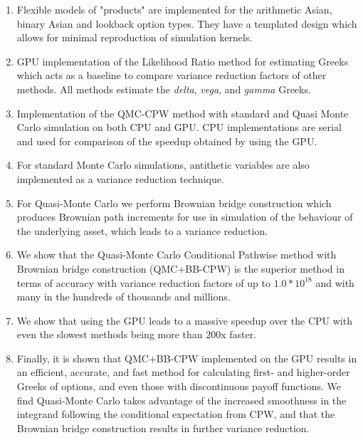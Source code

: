 \begin{enumerate}
    \item Flexible models of "products" are implemented for the arithmetic Asian, binary Asian and lookback option types. They have a templated design which allows for minimal reproduction of simulation kernels.
    \item GPU implementation of the Likelihood Ratio method for estimating Greeks which acts as a baseline to compare variance reduction factors of other methods. All methods estimate the \textit{delta}, \textit{vega}, and \textit{gamma} Greeks.
    \item Implementation of the QMC-CPW method with standard and Quasi Monte Carlo simulation on both CPU and GPU. CPU implementations are serial and used for comparison of the speedup obtained by using the GPU.
    \item For standard Monte Carlo simulations, antithetic variables are also implemented as a variance reduction technique.
    \item For Quasi-Monte Carlo we perform Brownian bridge construction which produces Brownian path increments for use in simulation of the behaviour of the underlying asset, which leads to a variance reduction.
    \item We show that the Quasi-Monte Carlo Conditional Pathwise method with Brownian bridge construction (QMC+BB-CPW) is the superior method in terms of accuracy with variance reduction factors of up to $1.0 * 10^{18}$ and with many in the hundreds of thousands and millions.
    \item We show that using the GPU leads to a massive speedup over the CPU with even the slowest methods being more than $200$x faster.
    \item Finally, it is shown that QMC+BB-CPW implemented on the GPU results in an efficient, accurate, and fast method for calculating first- and higher-order Greeks of options, and even those with discontinuous payoff functions. We find Quasi-Monte Carlo takes advantage of the increased smoothness in the integrand following the conditional expectation from CPW, and that the Brownian bridge construction results in further variance reduction.
\end{enumerate}